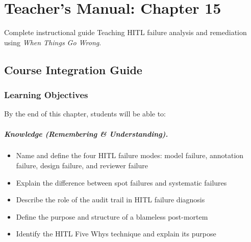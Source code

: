 
\chapter{Teacher's Manual: Chapter 15}
\label{ch:teacher-ch15}

\begin{chapterquote}{Complete instructional guide}
Teaching HITL failure analysis and remediation using \emph{When Things Go Wrong}.
\end{chapterquote}

\section{Course Integration Guide}

\subsection{Learning Objectives}

By the end of this chapter, students will be able to:

\paragraph{Knowledge (Remembering \& Understanding).}
\begin{itemize}
    \item Name and define the four HITL failure modes: model failure, annotation failure, design failure, and reviewer failure
    \item Explain the difference between spot failures and systematic failures
    \item Describe the role of the audit trail in HITL failure diagnosis
    \item Define the purpose and structure of a blameless post-mortem
    \item Identify the HITL Five Whys technique and explain its purpose
\end{itemize}

